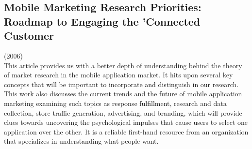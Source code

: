 \subsection{Mobile Marketing Research Priorities: Roadmap to Engaging the 'Connected Customer}

(2006) \\

This article provides us with a better depth of understanding behind the theory of market research in the mobile application market. It hits upon several key concepts that will be important to incorporate and distinguish in our research.  This work also discusses the current trends and the future of mobile application marketing examining such topics as response fulfillment, research and data collection, store traffic generation, advertising, and branding, which will provide clues towards uncovering the psychological impulses that cause users to select one application over the other. It is a reliable first-hand resource from an organization that specializes in understanding what people want.\\